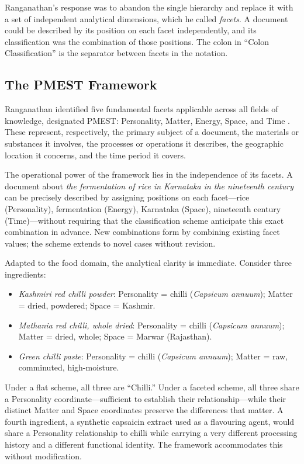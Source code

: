 \documentclass[12pt,a3paper]{article}
\begin{document}
Ranganathan's response was to abandon the single hierarchy and replace it with a set of independent analytical dimensions, which he called \textit{facets}. A document could be described by its position on each facet independently, and its classification was the combination of those positions. The colon in ``Colon Classification'' is the separator between facets in the notation.

\subsection{The PMEST Framework}

Ranganathan identified five fundamental facets applicable across all fields of knowledge, designated PMEST: Personality, Matter, Energy, Space, and Time \cite{Ranganathan_PMEST}. These represent, respectively, the primary subject of a document, the materials or substances it involves, the processes or operations it describes, the geographic location it concerns, and the time period it covers.

The operational power of the framework lies in the independence of its facets. A document about \textit{the fermentation of rice in Karnataka in the nineteenth century} can be precisely described by assigning positions on each facet---rice (Personality), fermentation (Energy), Karnataka (Space), nineteenth century (Time)---without requiring that the classification scheme anticipate this exact combination in advance. New combinations form by combining existing facet values; the scheme extends to novel cases without revision.

Adapted to the food domain, the analytical clarity is immediate. Consider three ingredients:

\begin{itemize}[itemsep=2pt]
  \item \textit{Kashmiri red chilli powder}: Personality = chilli (\textit{Capsicum annuum}); Matter = dried, powdered; Space = Kashmir.
  \item \textit{Mathania red chilli, whole dried}: Personality = chilli (\textit{Capsicum annuum}); Matter = dried, whole; Space = Marwar (Rajasthan).
  \item \textit{Green chilli paste}: Personality = chilli (\textit{Capsicum annuum}); Matter = raw, comminuted, high-moisture.
\end{itemize}

Under a flat scheme, all three are ``Chilli.'' Under a faceted scheme, all three share a Personality coordinate---sufficient to establish their relationship---while their distinct Matter and Space coordinates preserve the differences that matter. A fourth ingredient, a synthetic capsaicin extract used as a flavouring agent, would share a Personality relationship to chilli while carrying a very different processing history and a different functional identity. The framework accommodates this without modification.
\end{document}
